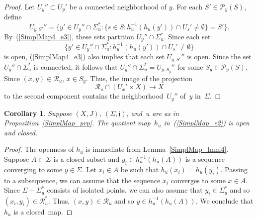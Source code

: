 \documentclass[11pt]{article}
\numberwithin{equation}{section}
\newtheorem{crl}[thm]{Corollary}
\theoremstyle{definition}
\def\eref#1{(\ref{#1})}
\def\lra{\longrightarrow}
\def\fj{\mathfrak j}
\def\cP{\mathcal P}
\def\cR{\mathcal R}
\def\Si{\Sigma}
\def\eset{\emptyset}
\begin{document}
\begin{proof}
\vspace{.2in}

\noindent
Let $U_y''\!\subset\!U_y'$ be a connected neighborhood of $y$.
For each $S'\!\in\!\cP_y(S)$, define
$$U_{y;S'}''=\big\{y'\!\in\!U_y''\!\cap\!\Si_u^*\!:
\{s\!\in\!S\!:h_u^{-1}(h_u(y'))\!\cap\!U_s'\!\neq\!\eset\}\!=\!S'\big\}.$$
By~\eref{SimplMap4_e3}, these sets partition $U_y''\!\cap\!\Si_u^*$.
Since each set
$$\big\{y'\!\in\!U_y''\!\cap\!\Si_u^*\!:h_u^{-1}(h_u(y'))\!\cap\!U_s'\!\neq\!\eset\big\}$$
is open, \eref{SimplMap4_e3} also implies that each set $U_{y;S'}''$ is open.
Since the set $U_y''\!\cap\!\Si_u^*$ is connected, it follows that 
$U_y''\!\cap\!\Si_u^*\!=\!U_{y;S_y}''$ for some $S_y\!\in\!\cP_y(S)$.
Since $(x,y)\!\in\!\cR_u$, $x\!\in\!S_y$.
Thus, the image of the projection
$$\cR_u\cap (U_x'\!\times\!X)\lra X$$
to the second component contains the neighborhood~$U_y''$ of~$y$ in~$\Si$.
\end{proof}


\begin{crl}\label{SimplMap_crl}
Suppose $(X,J)$, $(\Si,\fj)$, and~$u$ are as in Proposition~\ref{SimplMap_prp}.
The quotient map~$h_u$ in~\eref{SimplMap_e2} is open and closed.
\end{crl}

\begin{proof}
The openness of $h_u$ is immediate from Lemma~\ref{SimplMap_lmm4}.
Suppose $A\!\subset\!\Si$ is a closed subset and $y_i\!\in\!h_u^{-1}(h_u(A))$
is a sequence converging to some $y\!\in\!\Si$.
Let $x_i\!\in\!A$ be such that \hbox{$h_u(x_i)\!=\!h_u(y_i)$}.
Passing to a subsequence, we can assume that the sequence $x_i$ converges to some $x\!\in\!A$.
Since $\Si\!-\!\Si_u^*$ consists of isolated points, we can also assume that 
$y_i\!\in\!\Si_u^*$ and so $(x_i,y_i)\!\in\!\cR_u^*$.
Thus, $(x,y)\!\in\!\cR_u$ and so $y\!\in\!h_u^{-1}(h_u(A))$.
We conclude that $h_u$ is a closed~map.
\end{proof}
\end{document}
